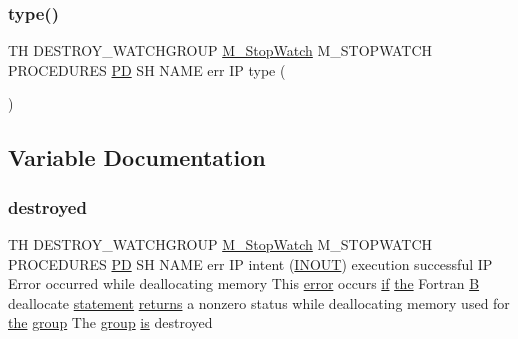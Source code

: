 \mbox{\label{destroy__watchgroup_83_8txt_ab623f536d615ff3d6357e73f12566b46}} 
\subsubsection{\texorpdfstring{type()}{type()}}
{\footnotesize\ttfamily TH D\+E\+S\+T\+R\+O\+Y\+\_\+\+W\+A\+T\+C\+H\+G\+R\+O\+UP \hyperlink{option__stopwatch_83_8txt_aa2011fc45a5e502e87ee50996a8a9305}{M\+\_\+\+Stop\+Watch} M\+\_\+\+S\+T\+O\+P\+W\+A\+T\+CH P\+R\+O\+C\+E\+D\+U\+R\+ES \hyperlink{what__overview_81_8txt_a85f26da5a4481fbdb0d9c79f2b94de3e}{PD} SH N\+A\+ME err IP type (\begin{DoxyParamCaption}\item[{watchgroup}]{ }\end{DoxyParamCaption})}



\subsection{Variable Documentation}
\mbox{\label{destroy__watchgroup_83_8txt_aa8895bfb33bae6c686314ee89dc98fa2}} 
\subsubsection{\texorpdfstring{destroyed}{destroyed}}
{\footnotesize\ttfamily TH D\+E\+S\+T\+R\+O\+Y\+\_\+\+W\+A\+T\+C\+H\+G\+R\+O\+UP \hyperlink{option__stopwatch_83_8txt_aa2011fc45a5e502e87ee50996a8a9305}{M\+\_\+\+Stop\+Watch} M\+\_\+\+S\+T\+O\+P\+W\+A\+T\+CH P\+R\+O\+C\+E\+D\+U\+R\+ES \hyperlink{what__overview_81_8txt_a85f26da5a4481fbdb0d9c79f2b94de3e}{PD} SH N\+A\+ME err IP intent (\hyperlink{M__stopwatch_83_8txt_aac11c70dd588f9c3fe71e95dbe89902f}{I\+N\+O\+UT}) execution successful IP Error occurred while deallocating memory This \hyperlink{M__stopwatch_83_8txt_ac4611edff506351be87ddb9adfc62315}{error} occurs \hyperlink{exit_87_8txt_a77395982f8d25581c808c40f3b634d90}{if} \hyperlink{M__stopwatch_83_8txt_a0f266597de2e57eb3aa964927bb30e14}{the} Fortran \hyperlink{intro__blas1_83_8txt_a5f157716d3fd55e7b7e08312dc859b58}{B} deallocate \hyperlink{M__stopwatch_83_8txt_a43758526aa61bbaa49faf1e287658350}{statement} \hyperlink{M__stopwatch_83_8txt_aee54cdd5349bf498aa96e7f9426a0717}{returns} a nonzero status while deallocating memory used for \hyperlink{M__stopwatch_83_8txt_a0f266597de2e57eb3aa964927bb30e14}{the} \hyperlink{M__stopwatch_83_8txt_a80fa32a76a22835e3c85462b2803875c}{group} The \hyperlink{M__stopwatch_83_8txt_a80fa32a76a22835e3c85462b2803875c}{group} \hyperlink{intro__blas1_83_8txt_a42a91df93f840595de3019ceb5d1df23}{is} destroyed}

